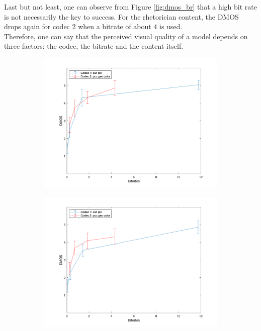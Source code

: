 \documentclass{article}
\begin{document}
Last but not least, one can observe from Figure \ref{fig:dmos_br} that a high bit rate is not necessarily the key to success. For the \textsf{rhetorician} content, the DMOS drops again for codec 2 when a bitrate of about $4$ is used. \\

Therefore, one can say that the perceived visual quality of a model depends on three factors: the codec, the bitrate and the content itself.

\begin{figure}
\begin{subfigure}[b]{0.49 \textwidth}
\includegraphics[width=\textwidth]{Figures/task1/dmos_guanyin.png}
\end{subfigure}
\begin{subfigure}[b]{0.49 \textwidth}
\includegraphics[width=\textwidth]{Figures/task1/dmos_long_dress.png}

\end{subfigure}
\end{figure}
\end{document}
